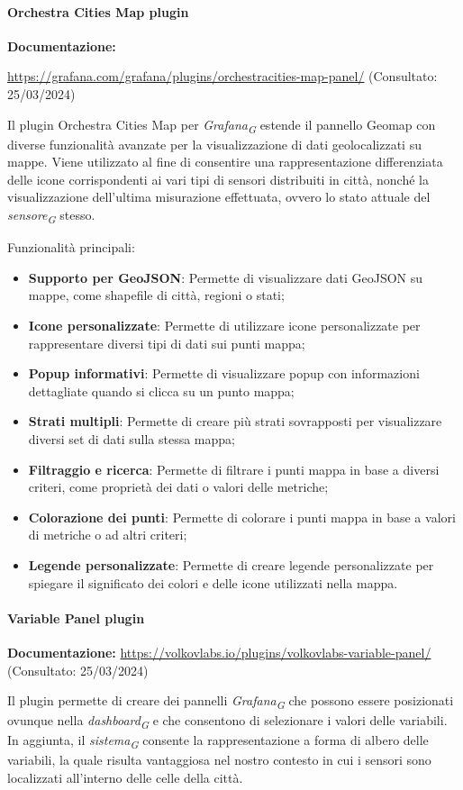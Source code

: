 \paragraph{Orchestra Cities Map plugin}
\textbf{Documentazione:}

\url{https://grafana.com/grafana/plugins/orchestracities-map-panel/} (Consultato: 25/03/2024)

Il plugin Orchestra Cities Map per \textit{Grafana}\textsubscript{\textit{G}} estende il pannello Geomap con diverse funzionalità avanzate per la visualizzazione di dati geolocalizzati su mappe.
Viene utilizzato al fine di consentire una rappresentazione differenziata delle icone corrispondenti ai vari tipi di sensori distribuiti in città, nonché la visualizzazione dell'ultima misurazione effettuata, ovvero lo stato attuale del \textit{sensore}\textsubscript{\textit{G}} stesso.

Funzionalità principali:
\begin{itemize}
    \item \textbf{Supporto per GeoJSON}: Permette di visualizzare dati GeoJSON su mappe, come shapefile di città, regioni o stati;
    \item \textbf{Icone personalizzate}: Permette di utilizzare icone personalizzate per rappresentare diversi tipi di dati sui punti mappa;
    \item \textbf{Popup informativi}: Permette di visualizzare popup con informazioni dettagliate quando si clicca su un punto mappa;
    \item \textbf{Strati multipli}: Permette di creare più strati sovrapposti per visualizzare diversi set di dati sulla stessa mappa;
    \item \textbf{Filtraggio e ricerca}: Permette di filtrare i punti mappa in base a diversi criteri, come proprietà dei dati o valori delle metriche;
    \item \textbf{Colorazione dei punti}: Permette di colorare i punti mappa in base a valori di metriche o ad altri criteri;
    \item \textbf{Legende personalizzate}: Permette di creare legende personalizzate per spiegare il significato dei colori e delle icone utilizzati nella mappa.
\end{itemize}

\paragraph{Variable Panel plugin}
\textbf{Documentazione:}
\url{https://volkovlabs.io/plugins/volkovlabs-variable-panel/} (Consultato: 25/03/2024)


Il plugin permette di creare dei pannelli \textit{Grafana}\textsubscript{\textit{G}} che possono essere posizionati ovunque nella \textit{dashboard}\textsubscript{\textit{G}} e che consentono di selezionare i valori delle variabili.
In aggiunta, il \textit{sistema}\textsubscript{\textit{G}} consente la rappresentazione a forma di albero delle variabili, la quale risulta vantaggiosa nel nostro contesto in cui i sensori sono localizzati all'interno delle celle della città.


